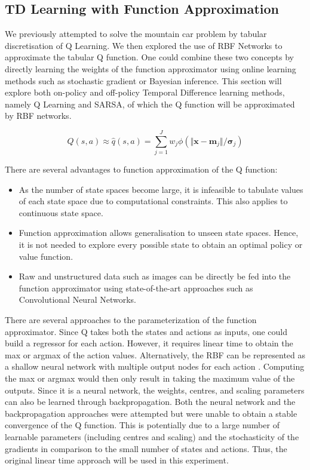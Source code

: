 \documentclass{article}
\begin{document}
\subsection{TD Learning with Function Approximation}

We previously attempted to solve the mountain car problem by tabular discretisation of Q Learning. We then explored the use of RBF Networks to approximate the tabular Q function. One could combine these two concepts by directly learning the weights of the function approximator using online learning methods such as stochastic gradient or Bayesian inference. This section will explore both on-policy and off-policy Temporal Difference learning methods, namely Q Learning and SARSA, of which the Q function will be approximated by RBF networks.

\begin{equation}
    Q(s, a) \approx \hat{q}(s, a) = \sum_{j = 1}^{J} w_j \phi(\Vert \pmb{x} - \pmb{m}_j \Vert / \pmb{\sigma}_j)
\end{equation}

There are several advantages to function approximation of the Q function:
\begin{itemize}
    \item As the number of state spaces become large, it is infeasible to tabulate values of each state space due to computational constraints. This also applies to continuous state space.
    \item Function approximation allows generalisation to unseen state spaces. Hence, it is not needed to explore every possible state to obtain an optimal policy or value function.
    \item Raw and unstructured data such as images can be directly be fed into the function approximator using state-of-the-art approaches such as Convolutional Neural Networks.
\end{itemize}

There are several approaches to the parameterization of the function approximator. Since Q takes both the states and actions as inputs, one could build a regressor for each action. However, it requires linear time to obtain the max or argmax of the action values. Alternatively, the RBF can be represented as a shallow neural network with multiple output nodes for each action \cite{mnihPlayingAtariDeep2013}. Computing the max or argmax would then only result in taking the maximum value of the outputs. Since it is a neural network, the weights, centres, and scaling parameters can also be learned through backpropagation. Both the neural network and the backpropagation approaches were attempted but were unable to obtain a stable convergence of the Q function. This is potentially due to a large number of learnable parameters (including centres and scaling) and the stochasticity of the gradients in comparison to the small number of states and actions. Thus, the original linear time approach will be used in this experiment.
\end{document}
